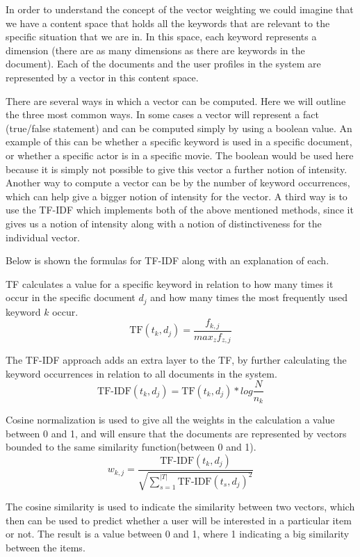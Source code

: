 In order to understand the concept of the vector weighting we could imagine that we have a content space that holds all the keywords that are relevant to the specific situation that we are in. In this space, each keyword represents a dimension (there are as many dimensions as there are keywords in the document). Each of the documents and the user profiles in the system are represented by a vector in this content space.

There are several ways in which a vector can be computed. Here we will outline the three most common ways.
In some cases a vector will represent a fact (true/false statement) and can be computed simply by using a boolean value. An example of this can be whether a specific keyword is used in a specific document, or whether a specific actor is in a specific movie. The boolean would be used here because it is simply not possible to give this vector a further notion of intensity.\newline
Another way to compute a vector can be by the number of keyword occurrences, which can help give a bigger notion of intensity for the vector.\newline
A third way is to use the TF-IDF which implements both of the above mentioned methods, since it gives us a notion of intensity along with a notion of distinctiveness for the individual vector.\newline

Below is shown the formulas for TF-IDF along with an explanation of each.

TF calculates a value for a specific keyword in relation to how many times it occur in the specific document \(d_{j}\) and how many times the most frequently used keyword \(k\) occur.
\[
	\text{TF}(t_{k},d_{j}) = \frac{f_{k,j}}{max_{z}f_{z,j}}
\]

The TF-IDF approach adds an extra layer to the TF, by further calculating the keyword occurrences in relation to all documents in the system.
\[
	\text{TF-IDF}(t_{k},d_{j}) = \text{TF}(t_{k},d_{j}) * log{\frac{N}{n_{k}}}
\]

Cosine normalization is used to give all the weights in the calculation a value between 0 and 1, and will ensure that the documents are represented by vectors bounded to the same similarity function(between 0 and 1).
\[
	w_{k,j} = \frac{\text{TF-IDF}(t_{k},d_{j})}{\sqrt{\sum_{s=1}^{|T|} \text{TF-IDF}(t_{s}, d_{j})^2}}
\]

The cosine similarity is used to indicate the similarity between two vectors, which then can be used to predict whether a user will be interested in a particular item or not. The result is a value between 0 and 1, where 1 indicating a big similarity between the items.

